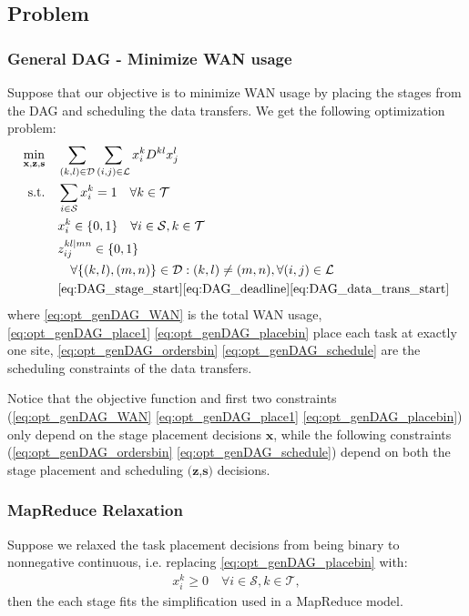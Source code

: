 \subsection{Problem}

\subsubsection{General DAG - Minimize WAN usage}

Suppose that our objective is to minimize WAN usage by placing the stages from the DAG and scheduling the data transfers.  We get the following optimization problem:
\begin{subequations} \label{eq:opt_genDAG}
	\begin{align}
		\min_{\mathbf{x},\mathbf{z},\mathbf{s}} \quad & \sum_{(k,l)\in\mathcal{D}}\sum_{(i,j)\in\mathcal{L}}x_i^kD^{kl}x_j^l \label{eq:opt_genDAG_WAN} \\
		\text{s.t.} \quad & \sum_{i\in\mathcal{S}}x_i^k = 1 \quad \forall k\in\mathcal{T} \label{eq:opt_genDAG_place1} \\
		& x_i^k \in\{0,1\} \quad \forall i\in\mathcal{S},k\in\mathcal{T} \label{eq:opt_genDAG_placebin} \\
		& z_{ij}^{kl|mn} \in\{0,1\} \nonumber\\
		& \quad \forall \{(k,l),(m,n)\} \in\mathcal{D}:(k,l)\neq(m,n), \forall(i,j)\in\mathcal{L} \label{eq:opt_genDAG_ordersbin} \\
		& \eqref{eq:DAG_stage_start} \eqref{eq:DAG_deadline} \eqref{eq:DAG_data_trans_start} \label{eq:opt_genDAG_schedule}
	\end{align}
\end{subequations}
where \eqref{eq:opt_genDAG_WAN} is the total WAN usage, \eqref{eq:opt_genDAG_place1} \eqref{eq:opt_genDAG_placebin} place each task at exactly one site, \eqref{eq:opt_genDAG_ordersbin} \eqref{eq:opt_genDAG_schedule} are the scheduling constraints of the data transfers.

Notice that the objective function and first two constraints (\eqref{eq:opt_genDAG_WAN} \eqref{eq:opt_genDAG_place1} \eqref{eq:opt_genDAG_placebin}) only depend on the stage placement decisions $\mathbf{x}$, while the following constraints (\eqref{eq:opt_genDAG_ordersbin} \eqref{eq:opt_genDAG_schedule}) depend on both the stage placement and scheduling $(\mathbf{z}$,$\mathbf{s})$ decisions.

\subsubsection{MapReduce Relaxation}
Suppose we relaxed the task placement decisions from being binary to nonnegative continuous, i.e. replacing \eqref{eq:opt_genDAG_placebin} with:
\begin{align}
	x_i^k \geq 0 \quad \forall i\in\mathcal{S},k\in\mathcal{T},
\end{align}
then the each stage fits the simplification used in a MapReduce model.

